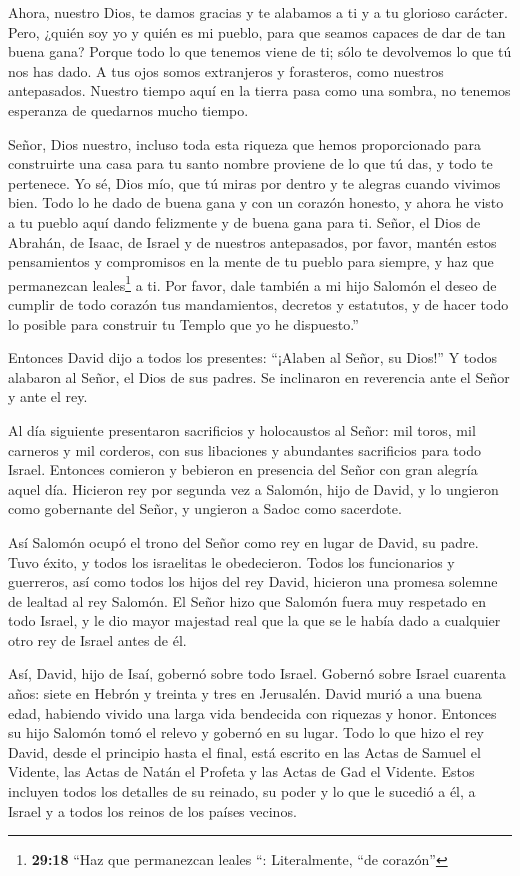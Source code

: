  Ahora, nuestro Dios, te damos gracias y te alabamos a ti y
a tu glorioso carácter.  Pero, ¿quién soy yo y quién es mi
pueblo, para que seamos capaces de dar de tan buena gana? Porque todo lo
que tenemos viene de ti; sólo te devolvemos lo que tú nos has dado.
 A tus ojos somos extranjeros y forasteros, como nuestros
antepasados. Nuestro tiempo aquí en la tierra pasa como una sombra, no
tenemos esperanza de quedarnos mucho tiempo.

 Señor, Dios nuestro, incluso toda esta riqueza que hemos
proporcionado para construirte una casa para tu santo nombre proviene de
lo que tú das, y todo te pertenece.  Yo sé, Dios mío, que
tú miras por dentro y te alegras cuando vivimos bien. Todo lo he dado de
buena gana y con un corazón honesto, y ahora he visto a tu pueblo aquí
dando felizmente y de buena gana para ti.  Señor, el Dios
de Abrahán, de Isaac, de Israel y de nuestros antepasados, por favor,
mantén estos pensamientos y compromisos en la mente de tu pueblo para
siempre, y haz que permanezcan leales\footnote{\textbf{29:18} ``Haz que
  permanezcan leales ``: Literalmente, ``de corazón''} a ti.
 Por favor, dale también a mi hijo Salomón el deseo de
cumplir de todo corazón tus mandamientos, decretos y estatutos, y de
hacer todo lo posible para construir tu Templo que yo he dispuesto.''

 Entonces David dijo a todos los presentes: ``¡Alaben al
Señor, su Dios!'' Y todos alabaron al Señor, el Dios de sus padres. Se
inclinaron en reverencia ante el Señor y ante el rey.

 Al día siguiente presentaron sacrificios y holocaustos al
Señor: mil toros, mil carneros y mil corderos, con sus libaciones y
abundantes sacrificios para todo Israel.  Entonces comieron
y bebieron en presencia del Señor con gran alegría aquel día. Hicieron
rey por segunda vez a Salomón, hijo de David, y lo ungieron como
gobernante del Señor, y ungieron a Sadoc como sacerdote.

 Así Salomón ocupó el trono del Señor como rey en lugar de
David, su padre. Tuvo éxito, y todos los israelitas le obedecieron.
 Todos los funcionarios y guerreros, así como todos los
hijos del rey David, hicieron una promesa solemne de lealtad al rey
Salomón.  El Señor hizo que Salomón fuera muy respetado en
todo Israel, y le dio mayor majestad real que la que se le había dado a
cualquier otro rey de Israel antes de él.

 Así, David, hijo de Isaí, gobernó sobre todo Israel.
 Gobernó sobre Israel cuarenta años: siete en Hebrón y
treinta y tres en Jerusalén.  David murió a una buena edad,
habiendo vivido una larga vida bendecida con riquezas y honor. Entonces
su hijo Salomón tomó el relevo y gobernó en su lugar.  Todo
lo que hizo el rey David, desde el principio hasta el final, está
escrito en las Actas de Samuel el Vidente, las Actas de Natán el Profeta
y las Actas de Gad el Vidente.  Estos incluyen todos los
detalles de su reinado, su poder y lo que le sucedió a él, a Israel y a
todos los reinos de los países vecinos.
